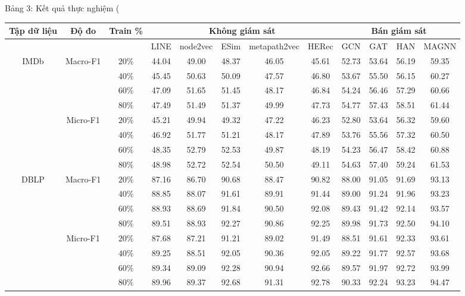 


Bảng 3: Kết quả thực nghiệm (%
\begin{center}
\begin{tabular}{|c|c|c|c|c|c|c|c|c|c|c|c|}
\hline
\multirow{2}{*}{Tập dữ liệu} & \multirow{2}{*}{Độ đo} & \multirow{2}{*}{Train \%} & \multicolumn{5}{|c|}{Không giám sát} & \multicolumn{4}{|c|}{Bán giám sát} \\
\hline
 &  &  & LINE & node2vec & ESim & metapath2vec & HERec & GCN & GAT & HAN & MAGNN \\
\hline
\multirow{8}{*}{IMDb} & \multirow{4}{*}{Macro-F1} & $20 \%$ & 44.04 & 49.00 & 48.37 & 46.05 & 45.61 & 52.73 & 53.64 & 56.19 & 59.35 \\
\hline
 &  & $40 \%$ & 45.45 & 50.63 & 50.09 & 47.57 & 46.80 & 53.67 & 55.50 & 56.15 & 60.27 \\
\hline
 &  & $60 \%$ & 47.09 & 51.65 & 51.45 & 48.17 & 46.84 & 54.24 & 56.46 & 57.29 & 60.66 \\
\hline
 &  & $80 \%$ & 47.49 & 51.49 & 51.37 & 49.99 & 47.73 & 54.77 & 57.43 & 58.51 & 61.44 \\
\hline
 & \multirow{4}{*}{Micro-F1} & $20 \%$ & 45.21 & 49.94 & 49.32 & 47.22 & 46.23 & 52.80 & 53.64 & 56.32 & 59.60 \\
\hline
 &  & $40 \%$ & 46.92 & 51.77 & 51.21 & 48.17 & 47.89 & 53.76 & 55.56 & 57.32 & 60.50 \\
\hline
 &  & $60 \%$ & 48.35 & 52.79 & 52.53 & 49.87 & 48.19 & 54.23 & 56.47 & 58.42 & 60.88 \\
\hline
 &  & $80 \%$ & 48.98 & 52.72 & 52.54 & 50.50 & 49.11 & 54.63 & 57.40 & 59.24 & 61.53 \\
\hline
\multirow{8}{*}{DBLP} & \multirow{4}{*}{Macro-F1} & $20 \%$ & 87.16 & 86.70 & 90.68 & 88.47 & 90.82 & 88.00 & 91.05 & 91.69 & 93.13 \\
\hline
 &  & $40 \%$ & 88.85 & 88.07 & 91.61 & 89.91 & 91.44 & 89.00 & 91.24 & 91.96 & 93.23 \\
\hline
 &  & $60 \%$ & 88.93 & 88.69 & 91.84 & 90.50 & 92.08 & 89.43 & 91.42 & 92.14 & 93.57 \\
\hline
 &  & $80 \%$ & 89.51 & 88.93 & 92.27 & 90.86 & 92.25 & 89.98 & 91.73 & 92.50 & 94.10 \\
\hline
 & \multirow{4}{*}{Micro-F1} & $20 \%$ & 87.68 & 87.21 & 91.21 & 89.02 & 91.49 & 88.51 & 91.61 & 92.33 & 93.61 \\
\hline
 &  & $40 \%$ & 89.25 & 88.51 & 92.05 & 90.36 & 92.05 & 89.22 & 91.77 & 92.57 & 93.68 \\
\hline
 &  & $60 \%$ & 89.34 & 89.09 & 92.28 & 90.94 & 92.66 & 89.57 & 91.97 & 92.72 & 93.99 \\
\hline
 &  & $80 \%$ & 89.96 & 89.37 & 92.68 & 91.31 & 92.78 & 90.33 & 92.24 & 93.23 & 94.47 \\
\hline
\end{tabular}
\end{center}



